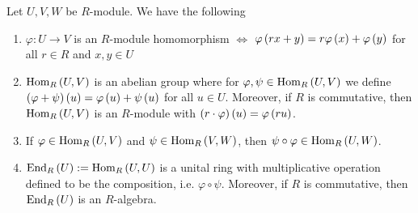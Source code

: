 \begin{pro}
    Let $U,V,W$ be $R$-module. We have the following
    \begin{enumerate}
        \item $\varphi:U\to V$ is an $R$-module homomorphism $\iff$ $\varphi\left(rx+y\right)=r\varphi\left(x\right)+\varphi\left(y\right)$ for all $r\in R$ and $x,y\in U$
        \item $\operatorname{Hom}_R\left(U,V\right)$ is an abelian group where for $\varphi,\psi\in \operatorname{Hom}_R\left(U,V\right)$ we define $\left(\varphi+\psi\right)\left(u\right)=\varphi\left(u\right)+\psi\left(u\right)$ for all $u\in U$. Moreover, if $R$ is commutative, then $\operatorname{Hom}_R\left(U,V\right)$ is an $R$-module with $\left(r\cdot \varphi\right)\left(u\right)=\varphi\left(ru\right)$.
        \item If $\varphi\in \operatorname{Hom}_R\left(U,V\right)$ and $\psi\in \operatorname{Hom}_R\left(V,W\right)$, then $\psi\circ\varphi\in \operatorname{Hom}_R\left(U,W\right)$.
        \item $\operatorname{End}_R\left(U\right):= \operatorname{Hom}_R\left(U,U\right)$ is a unital ring with multiplicative operation defined to be the composition, i.e. $\varphi\circ \psi$. Moreover, if $R$ is commutative, then $\operatorname{End}_R\left(U\right)$ is an $R$-algebra.
    \end{enumerate}
\end{pro}
